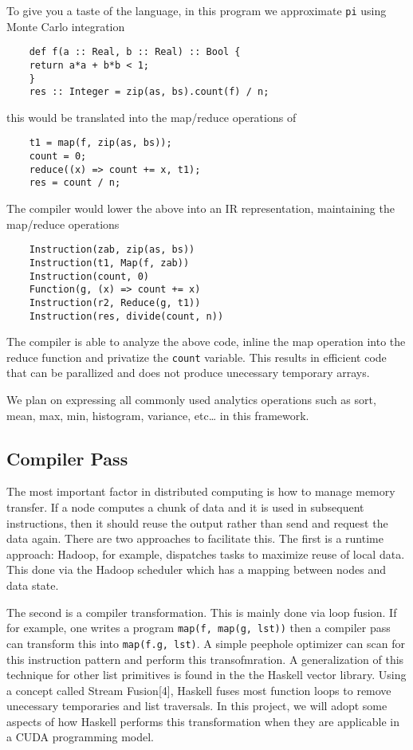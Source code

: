 To give you a taste of the language, in this program we approximate
\texttt{pi} using Monte Carlo integration

\begin{verbatim}
    def f(a :: Real, b :: Real) :: Bool {
    return a*a + b*b < 1;
    }
    res :: Integer = zip(as, bs).count(f) / n;
\end{verbatim}

this would be translated into the map/reduce operations of

\begin{verbatim}
    t1 = map(f, zip(as, bs));
    count = 0;
    reduce((x) => count += x, t1);
    res = count / n;
\end{verbatim}

The compiler would lower the above into an IR representation,
maintaining the map/reduce operations

\begin{verbatim}
    Instruction(zab, zip(as, bs))
    Instruction(t1, Map(f, zab))
    Instruction(count, 0)
    Function(g, (x) => count += x)
    Instruction(r2, Reduce(g, t1))
    Instruction(res, divide(count, n))
\end{verbatim}

The compiler is able to analyze the above code, inline the map operation
into the reduce function and privatize the \texttt{count} variable. This
results in efficient code that can be parallized and does not produce
unecessary temporary arrays.

We plan on expressing all commonly used analytics operations such as
sort, mean, max, min, histogram, variance, etc\ldots{} in this
framework.

\subsection{Compiler Pass}

The most important factor in distributed computing is how to manage
memory transfer. If a node computes a chunk of data and it is used in
subsequent instructions, then it should reuse the output rather than
send and request the data again. There are two approaches to facilitate
this. The first is a runtime approach: Hadoop, for example, dispatches
tasks to maximize reuse of local data. This done via the Hadoop
scheduler which has a mapping between nodes and data state.

The second is a compiler transformation. This is mainly done via loop
fusion. If for example, one writes a program
\texttt{map(f, map(g, lst))} then a compiler pass can transform this
into \texttt{map(f.g, lst)}. A simple peephole optimizer can scan for
this instruction pattern and perform this transofmration. A
generalization of this technique for other list primitives is found in
the the Haskell vector library. Using a concept called Stream
Fusion{[}4{]}, Haskell fuses most function loops to remove unecessary
temporaries and list traversals. In this project, we will adopt some
aspects of how Haskell performs this transformation when they are
applicable in a CUDA programming model.

